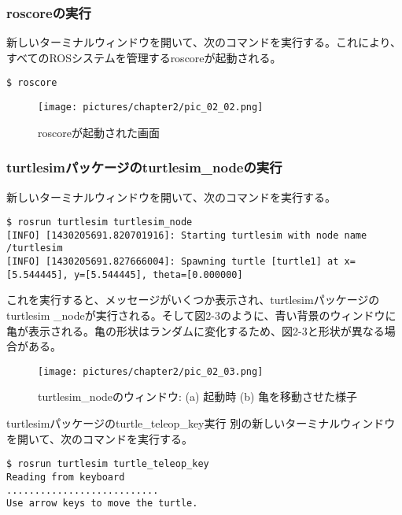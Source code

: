 \subsubsection{roscoreの実行}

新しいターミナルウィンドウを開いて、次のコマンドを実行する。これにより、すべてのROSシステムを管理するroscoreが起動される。

\begin{lstlisting}[language=ROS]
$ roscore
\end{lstlisting}

\begin{figure}[h]
  \centering
  \texttt{[image: pictures/chapter2/pic\_02\_02.png]}
  \caption{roscoreが起動された画面}
\end{figure}

\subsubsection{turtlesimパッケージのturtlesim\_nodeの実行}

新しいターミナルウィンドウを開いて、次のコマンドを実行する。

\begin{lstlisting}[language=ROS]
$ rosrun turtlesim turtlesim_node
[INFO] [1430205691.820701916]: Starting turtlesim with node name /turtlesim
[INFO] [1430205691.827666004]: Spawning turtle [turtle1] at x=[5.544445], y=[5.544445], theta=[0.000000]
\end{lstlisting}

これを実行すると、メッセージがいくつか表示され、turtlesimパッケージのturtlesim \_nodeが実行される。そして図2-3のように、青い背景のウィンドウに亀が表示される。亀の形状はランダムに変化するため、図2-3と形状が異なる場合がある。

\begin{figure}[h]
  \centering
  \texttt{[image: pictures/chapter2/pic\_02\_03.png]}
  \caption{turtlesim\_nodeのウィンドウ: (a) 起動時 (b) 亀を移動させた様子}
\end{figure}

turtlesimパッケージのturtle\_teleop\_key実行
別の新しいターミナルウィンドウを開いて、次のコマンドを実行する。

\begin{lstlisting}[language=ROS]
$ rosrun turtlesim turtle_teleop_key
Reading from keyboard
...........................
Use arrow keys to move the turtle.
\end{lstlisting}

